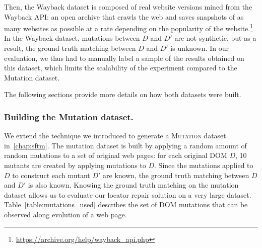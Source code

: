 Then, the {\sc Wayback} dataset is composed of real website versions mined from the Wayback API: an open archive that crawls the web and saves snapshots of as many websites as possible at a rate depending on the popularity of the website.\footnote{\url{https://archive.org/help/wayback_api.php}}
In the {\sc Wayback} dataset, mutations between $D$ and $D'$ are not synthetic, but as a result, the ground truth matching between $D$ and $D'$ is unknown.
In our evaluation, we thus had to manually label a sample of the results obtained on this dataset, which limits the scalability of the experiment compared to the {\sc Mutation} dataset. 

The following sections provide more details on how both datasets were built.

\subsubsection{Building the {\sc Mutation} dataset.}\label{mutationDataset}
We extend the technique we introduced to generate a \textsc{Mutation} dataset in~\ref{chap:sftm}.
The mutation dataset is built by applying a random amount of random mutations to a set of original web pages: for each original DOM $D$, 10 mutants are created by applying mutations to $D$.
Since the mutations applied to $D$ to construct each mutant $D'$ are known, the ground truth matching between $D$ and $D'$ is also known.
Knowing the ground truth matching on the mutation dataset allows us to evaluate our locator repair solution on a very large dataset. 
% 
Table~\ref{table:mutations_used} describes the set of DOM mutations that can be observed along evolution of a web page.

\begin{table}
    \caption{Mutations applied in the \textsc{Mutation} dataset~\ref{chap:sftm}.}
    \label{table:mutations_used}
    \centering
\end{table}

